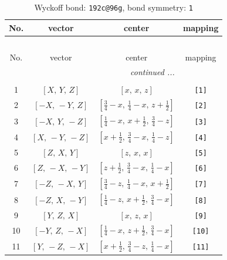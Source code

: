 \documentclass[fleqn,8pt]{jsarticle}
\begin{document}
\begin{longtable}{cccc}
\caption{Wyckoff bond: {\tt 192c@96g}, bond symmetry: {\tt 1}}
 \\
 \hline \hline
No. & vector & center & mapping \\ \hline \endfirsthead

\multicolumn{3}{l}{\tablename\ \thetable{}} \\
 \hline \hline
No. & vector & center & mapping \\ \hline \endhead

 \hline \hline
\multicolumn{3}{r}{\footnotesize\it continued ...} \\ \endfoot

 \hline \hline
\multicolumn{3}{r}{} \\ \endlastfoot

1 & $\left[ X,\, Y,\, Z \right]$ & $\left[ x,\, x,\, z \right]$ & {\tt [1]} \\ \hline
2 & $\left[ - X,\, - Y,\, Z \right]$ & $\left[ \frac{3}{4} - x,\, \frac{1}{4} - x,\, z + \frac{1}{2} \right]$ & {\tt [2]} \\ \hline
3 & $\left[ - X,\, Y,\, - Z \right]$ & $\left[ \frac{1}{4} - x,\, x + \frac{1}{2},\, \frac{3}{4} - z \right]$ & {\tt [3]} \\ \hline
4 & $\left[ X,\, - Y,\, - Z \right]$ & $\left[ x + \frac{1}{2},\, \frac{3}{4} - x,\, \frac{1}{4} - z \right]$ & {\tt [4]} \\ \hline
5 & $\left[ Z,\, X,\, Y \right]$ & $\left[ z,\, x,\, x \right]$ & {\tt [5]} \\ \hline
6 & $\left[ Z,\, - X,\, - Y \right]$ & $\left[ z + \frac{1}{2},\, \frac{3}{4} - x,\, \frac{1}{4} - x \right]$ & {\tt [6]} \\ \hline
7 & $\left[ - Z,\, - X,\, Y \right]$ & $\left[ \frac{3}{4} - z,\, \frac{1}{4} - x,\, x + \frac{1}{2} \right]$ & {\tt [7]} \\ \hline
8 & $\left[ - Z,\, X,\, - Y \right]$ & $\left[ \frac{1}{4} - z,\, x + \frac{1}{2},\, \frac{3}{4} - x \right]$ & {\tt [8]} \\ \hline
9 & $\left[ Y,\, Z,\, X \right]$ & $\left[ x,\, z,\, x \right]$ & {\tt [9]} \\ \hline
10 & $\left[ - Y,\, Z,\, - X \right]$ & $\left[ \frac{1}{4} - x,\, z + \frac{1}{2},\, \frac{3}{4} - x \right]$ & {\tt [10]} \\ \hline
11 & $\left[ Y,\, - Z,\, - X \right]$ & $\left[ x + \frac{1}{2},\, \frac{3}{4} - z,\, \frac{1}{4} - x \right]$ & {\tt [11]} \\ \hline

\end{longtable}
\end{document}
